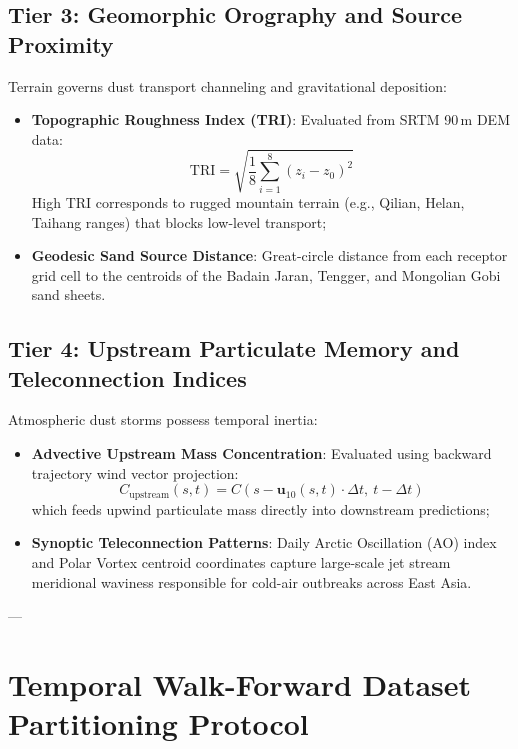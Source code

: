 \subsection{Tier 3: Geomorphic Orography and Source Proximity}
\label{subsec:tier3_geomorphology}

Terrain governs dust transport channeling and gravitational deposition:
\begin{itemize}
    \item \textbf{Topographic Roughness Index (TRI)}: Evaluated from SRTM 90\,m DEM data:
    \begin{equation}
    \label{eq:tri_formula}
    \text{TRI} = \sqrt{\frac{1}{8} \sum_{i=1}^8 \left(z_i - z_0\right)^2}
    \end{equation}
    High TRI corresponds to rugged mountain terrain (e.g., Qilian, Helan, Taihang ranges) that blocks low-level transport;
    \item \textbf{Geodesic Sand Source Distance}: Great-circle distance from each receptor grid cell to the centroids of the Badain Jaran, Tengger, and Mongolian Gobi sand sheets.
\end{itemize}

\subsection{Tier 4: Upstream Particulate Memory and Teleconnection Indices}
\label{subsec:tier4_teleconnections}

Atmospheric dust storms possess temporal inertia:
\begin{itemize}
    \item \textbf{Advective Upstream Mass Concentration}: Evaluated using backward trajectory wind vector projection:
    \begin{equation}
    \label{eq:upstream_advection}
    C_{\text{upstream}}(s, t) = C\left(s - \mathbf{u}_{10}(s, t) \cdot \Delta t, \ t - \Delta t\right)
    \end{equation}
    which feeds upwind particulate mass directly into downstream predictions;
    \item \textbf{Synoptic Teleconnection Patterns}: Daily Arctic Oscillation (AO) index and Polar Vortex centroid coordinates capture large-scale jet stream meridional waviness responsible for cold-air outbreaks across East Asia.
\end{itemize}

---

\section{Temporal Walk-Forward Dataset Partitioning Protocol}
\label{sec:dataset_split}

